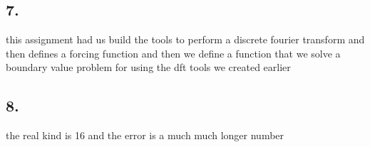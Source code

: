 \documentclass{article}
\begin{document}
        \subsection*{7.}
            this assignment had us build the tools to perform a discrete fourier transform and then defines a forcing function 
            and then we define a function that we solve a boundary value problem for using the dft tools we created earlier
        \subsection*{8.}
            the real kind is 16 and the error is a much much longer number 
\end{document}
